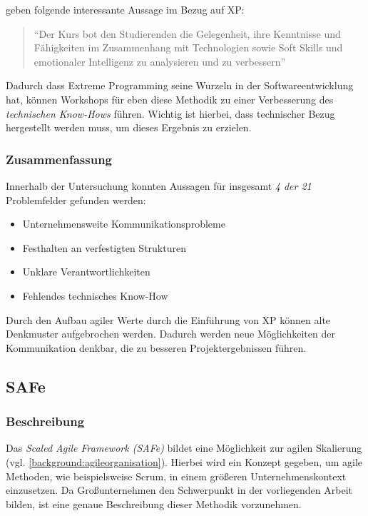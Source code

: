  geben folgende interessante Aussage im Bezug auf XP:

\begin{quote}
	``Der Kurs bot den Studierenden die Gelegenheit, ihre Kenntnisse und Fähigkeiten im Zusammenhang mit Technologien sowie Soft Skills und emotionaler Intelligenz zu analysieren und zu verbessern'' \cite[S. 6]{shahzad_training_nodate}
\end{quote}

Dadurch dass Extreme Programming seine Wurzeln in der Softwareentwicklung hat, können Workshops für eben diese Methodik zu einer Verbesserung des \textit{technischen Know-Hows} führen. Wichtig ist hierbei, dass technischer Bezug hergestellt werden muss, um dieses Ergebnis zu erzielen.


\subsubsection{Zusammenfassung}

Innerhalb der Untersuchung konnten Aussagen für insgesamt \textit{4 der 21} Problemfelder gefunden werden:

\begin{itemize}[noitemsep, topsep=0pt]
	\item Unternehmensweite Kommunikationsprobleme
	\item Festhalten an verfestigten Strukturen
	\item Unklare Verantwortlichkeiten
	\item Fehlendes technisches Know-How
\end{itemize}

Durch den Aufbau agiler Werte durch die Einführung von XP können alte Denkmuster aufgebrochen werden. Dadurch werden neue Möglichkeiten der Kommunikation denkbar, die zu besseren Projektergebnissen führen.

\subsection{SAFe}

\subsubsection{Beschreibung}

Das \textit{Scaled Agile Framework (SAFe)} bildet eine Möglichkeit zur agilen Skalierung (vgl. \ref{background:agileorganisation}). Hierbei wird ein Konzept gegeben, um agile Methoden, wie beispielsweise Scrum, in einem größeren Unternehmenskontext einzusetzen. Da Großunternehmen den Schwerpunkt in der vorliegenden Arbeit bilden, ist eine genaue Beschreibung dieser Methodik vorzunehmen.

